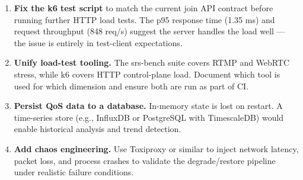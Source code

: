 \documentclass[a4paper,11pt]{article}
\begin{document}
\begin{enumerate}
  \item \textbf{Fix the k6 test script} to match the current join API contract before running further HTTP load tests. The p95 response time (1.35 ms) and request throughput (848 req/s) suggest the server handles the load well --- the issue is entirely in test-client expectations.
  \item \textbf{Unify load-test tooling.} The srs-bench suite covers RTMP and WebRTC stress, while k6 covers HTTP control-plane load. Document which tool is used for which dimension and ensure both are run as part of CI.
  \item \textbf{Persist QoS data to a database.} In-memory state is lost on restart. A time-series store (e.g., InfluxDB or PostgreSQL with TimescaleDB) would enable historical analysis and trend detection.
  \item \textbf{Add chaos engineering.} Use Toxiproxy or similar to inject network latency, packet loss, and process crashes to validate the degrade/restore pipeline under realistic failure conditions.
\end{enumerate}
\end{document}
